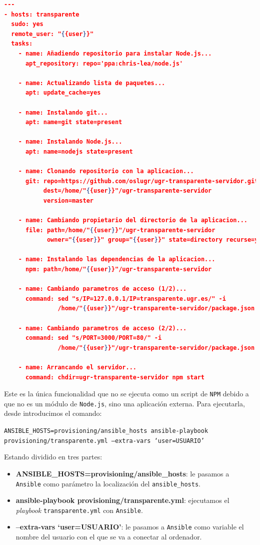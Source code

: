 \begin{lstlisting}[language=json,caption={Playbook de Ansible},label={lst:ansible}]
---
- hosts: transparente
  sudo: yes
  remote_user: "{{user}}"
  tasks:
    - name: Añadiendo repositorio para instalar Node.js...
      apt_repository: repo='ppa:chris-lea/node.js'

    - name: Actualizando lista de paquetes...
      apt: update_cache=yes

    - name: Instalando git...
      apt: name=git state=present

    - name: Instalando Node.js...
      apt: name=nodejs state=present

    - name: Clonando repositorio con la aplicacion...
      git: repo=https://github.com/oslugr/ugr-transparente-servidor.git
           dest=/home/"{{user}}"/ugr-transparente-servidor
           version=master

    - name: Cambiando propietario del directorio de la aplicacion...
      file: path=/home/"{{user}}"/ugr-transparente-servidor
            owner="{{user}}" group="{{user}}" state=directory recurse=yes

    - name: Instalando las dependencias de la aplicacion...
      npm: path=/home/"{{user}}"/ugr-transparente-servidor

    - name: Cambiando parametros de acceso (1/2)...
      command: sed "s/IP=127.0.0.1/IP=transparente.ugr.es/" -i
               /home/"{{user}}"/ugr-transparente-servidor/package.json

    - name: Cambiando parametros de acceso (2/2)...
      command: sed "s/PORT=3000/PORT=80/" -i
               /home/"{{user}}"/ugr-transparente-servidor/package.json

    - name: Arrancando el servidor...
      command: chdir=ugr-transparente-servidor npm start
\end{lstlisting}

Este es la única funcionalidad que no se ejecuta como un script de {\tt NPM} debido a que no es un módulo de {\tt Node.js}, sino una aplicación externa. Para ejecutarla, desde introducimos el comando:

\bigskip
{\tt ANSIBLE\_HOSTS=provisioning/ansible\_hosts ansible-playbook \newline provisioning/transparente.yml --extra-vars `user=USUARIO'}

\bigskip
Estando dividido en tres partes:

\begin{itemize}
	\item \textbf{ANSIBLE\_HOSTS=provisioning/ansible\_hosts}: le pasamos a {\tt Ansible} como parámetro la localización del {\tt ansible\_hosts}.
	\item \textbf{ansible-playbook provisioning/transparente.yml}: ejecutamos el \textit{playbook} {\tt transparente.yml} con {\tt Ansible}.
	\item \textbf{--extra-vars `user=USUARIO'}: le pasamos a {\tt Ansible} como variable el nombre del usuario con el que se va a conectar al ordenador.
\end{itemize}